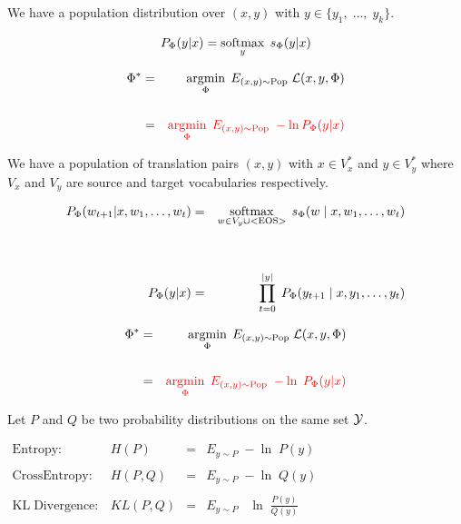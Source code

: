 {

We have a population distribution over $(x,y)$ with $y \in \{y_1,\;\ldots,\;y_k\}$.

\vfill
$$P_\Phi(y|x) = \operatorname*{softmax}_y\;s_\Phi(y|x)$$

\vfill
\begin{eqnarray*}
  \Phi^* & = & \operatorname*{argmin}_\Phi\;E_{(x,y) \sim \mathrm{Pop}}\;{\cal L}(x,y,\Phi) \\
  \\
  & = & {\color{red} \operatorname*{argmin}_\Phi\;E_{(x,y) \sim \mathrm{Pop}}\;- \ln P_\Phi(y|x)}
\end{eqnarray*}


We have a population of translation pairs $(x,y)$ with $x \in V_x^*$ and $y \in V_y^*$ where
$V_x$ and $V_y$ are source and target vocabularies respectively.

\vfill


\vfill
\begin{eqnarray*}
  P_\Phi(w_{t+1} | x,w_1,\ldots,w_t) & = & \operatorname*{softmax}_{w \in V_y \cup \mathrm{<EOS>}} \; s_\Phi(w\;|\;x,w_1,\ldots,w_t) \\
  \\
  \\
  P_\Phi(y|x) & = & \prod_{t = 0}^{|y|} \;P_\Phi(y_{t+1}\;|\;x,y_1,\ldots,y_t)
\end{eqnarray*}

\vfill
\vfill
\begin{eqnarray*}
  \Phi^* & = & \operatorname*{argmin}_\Phi \;E_{(x,y) \sim \mathrm{Pop}} \;{\cal L}(x,y,\Phi) \\
  \\
  & = & {\color{red} \operatorname*{argmin}_\Phi \;E_{(x,y) \sim \mathrm{Pop}} \;-\ln \;P_\Phi(y|x)}
\end{eqnarray*}


Let $P$ and $Q$ be two probability distributions on the same set ${\cal Y}$.

\vfill
\centerline{
  $\begin{array}{lrcl}
\mathrm{Entropy}: & H(P) & = & E_{y \sim P}\;-\ln\;P(y) \\
\\
\mathrm{Cross Entropy:} & H(P,Q) & = & E_{y \sim P}\;-\ln\;Q(y) \\
\\
\mathrm{KL\; Divergence:} & KL(P,Q) & = & E_{y \sim P}\;\;\; \ln\;\frac{P(y)}{Q(y)}
  \end{array}$}

}
